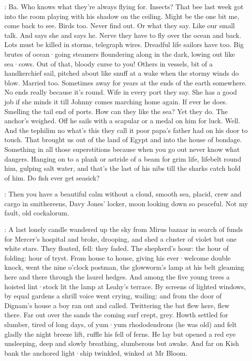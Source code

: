 \Bloom:
Ba.
Who knows
what they're always flying for.
Insects?
That bee last week
got into the room
playing with his shadow
on the ceiling.
Might be the one bit me,
come back to see.
Birds too.
Never find out.
Or what they say.
Like our small talk.
And says she
and says he.
Nerve they have
to fly over the ocean
and back.
Lots must be killed in storms,
telegraph wires.
Dreadful life
sailors have too.
Big brutes of ocean·going steamers
floundering along in the dark,
lowing out like sea·cows.
Out of that,
bloody curse to you!
Others in vessels,
bit of a handkerchief
sail,
pitched about
like snuff at a wake
when the stormy winds do blow.
Married too.
Sometimes
away for years
at the ends of the earth somewhere.
No ends really
because it's round.
Wife in every port
they say.
She has a good job
if she minds it
till Johnny comes marching home again.
If ever he does.
Smelling the tail end of ports.
How can they like the sea?
Yet they do.
The anchor's weighed.
Off he sails
with a scapular or a medal on him
for luck.
Well.
And the tephilim
no what's this they call it
poor papa's father
had on his door to touch.
That brought us
out of the land of Egypt
and into the house of bondage.
Something in all those superstitions
because when you go out
never know what dangers.
Hanging on to a plank
or astride of a beam
for grim life,
lifebelt round him,
gulping salt water,
and that's the last of his nibs
till the sharks catch hold of him.
Do fish ever get seasick?

\Bloom:
Then you have a beautiful calm
without a cloud,
smooth sea,
placid,
crew and cargo in smithereens,
Davy Jones' locker,
moon looking down so peaceful.
Not my fault,
old cockalorum.

:
A last lonely candle
wandered up the sky
from Mirus bazaar
in search of funds for Mercer's hospital
and broke,
drooping,
and shed a cluster of violet
but one white stars.
They floated,
fell:
they faded.
The shepherd's hour:
the hour of folding:
hour of tryst.
From house to house,
giving his ever·welcome double knock,
went the nine o'clock postman,
the glowworm's lamp at his belt
gleaming here and there
through the laurel hedges.
And among the five young trees
a hoisted lint·stock
lit the lamp at Leahy's terrace.
By screens of lighted windows,
by equal gardens
a shrill voice went crying,
wailing:
and from the door of Dignam's house
a boy ran out and called.
Twittering
the bat flew here,
flew there.
Far out over the sands
the coming surf crept,
grey.
Howth settled for slumber,
tired of long days,
of yum·yum rhododendrons
(he was old)
and felt gladly
the night breeze lift,
ruffle his fell of ferns.
He lay
but opened a red eye
unsleeping,
deep and slowly breathing,
slumberous but awake.
And far on Kish bank
the anchored light·ship twinkled,
winked at Mr Bloom.

